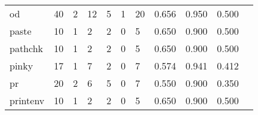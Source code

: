 \begin{longtable}{lp{1.2cm}p{1.2cm}p{1.2cm}p{1.2cm}p{1.2cm}p{1.2cm}p{1.2cm}p{1.2cm}p{1.2cm}p{1.2cm}}
od        &                                    40 &                                                  2 &                                                 12 &                                                  5 &                                                  1 &                                                 20 &                                              0.656 &                                              0.950 &                                              0.500 \\
paste     &                                    10 &                                                  1 &                                                  2 &                                                  2 &                                                  0 &                                                  5 &                                              0.650 &                                              0.900 &                                              0.500 \\
pathchk   &                                    10 &                                                  1 &                                                  2 &                                                  2 &                                                  0 &                                                  5 &                                              0.650 &                                              0.900 &                                              0.500 \\
pinky     &                                    17 &                                                  1 &                                                  7 &                                                  2 &                                                  0 &                                                  7 &                                              0.574 &                                              0.941 &                                              0.412 \\
pr        &                                    20 &                                                  2 &                                                  6 &                                                  5 &                                                  0 &                                                  7 &                                              0.550 &                                              0.900 &                                              0.350 \\
printenv  &                                    10 &                                                  1 &                                                  2 &                                                  2 &                                                  0 &                                                  5 &                                              0.650 &                                              0.900 &                                              0.500 \\

\end{longtable}
